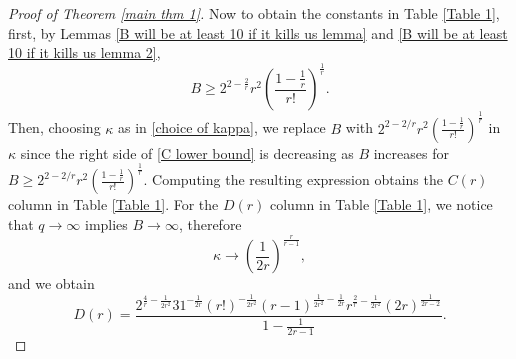\documentclass[10pt,a4paper]{amsart}
\begin{document}
\begin{proof}[Proof of Theorem \ref{main thm 1}]
Now to obtain the constants in Table \ref{Table 1}, first, by Lemmas \ref{B will be at least 10 if it kills us lemma} and \ref{B will be at least 10 if it kills us lemma 2},
\begin{equation}\label{B lower bound123}
B\ge 2^{2-\frac{2}{r}}r^2\left(\frac{1-\frac{1}{r}}{r!}\right)^{\frac{1}{r}}.
\end{equation}
Then, choosing $\kappa$ as in \eqref{choice of kappa}, we replace $B$ with $2^{2-2/r}r^2\left(\frac{1-\frac{1}{r}}{r!}\right)^{\frac{1}{r}}$ in $\kappa$ since the right side of \eqref{C lower bound} is decreasing as $B$ increases for $B\ge 2^{2-2/r}r^2\left(\frac{1-\frac{1}{r}}{r!}\right)^{\frac{1}{r}}$. Computing the resulting expression obtains the $C(r)$ column in Table \ref{Table 1}. 
For the $D(r)$ column in Table \ref{Table 1}, we notice that $q\rightarrow \infty$ implies $B\rightarrow \infty$, therefore $$\kappa\rightarrow \left(\frac{1}{2r}\right)^{\frac{r}{r-1}},$$
and we obtain
$$D(r) = \frac{2^{\frac{4}{r}-\frac{1}{2r^2}}31^{-\frac{1}{2r}}(r!)^{-\frac{1}{2r^2}}(r-1)^{\frac{1}{2r^2}-\frac{1}{2r}}r^{\frac{2}{r}-\frac{1}{2r^2}}(2r)^{\frac{1}{2r-2}}}{1-\frac{1}{2r-1}}.$$
\end{proof}
\end{document}
